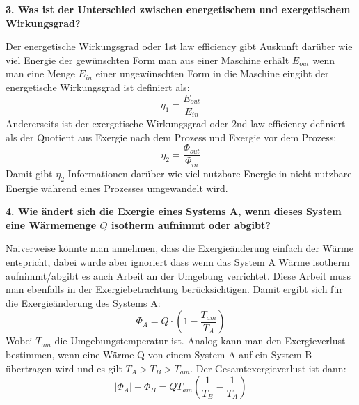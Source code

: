 \noindent\textbf{3. Was ist der Unterschied zwischen energetischem und exergetischem Wirkungsgrad?}\\
\begin{addmargin}[25pt]{0pt}
Der energetische Wirkungsgrad oder 1st law efficiency gibt Auskunft darüber wie viel Energie der gewünschten Form man aus einer Maschine erhält $E_{\si{out}}$ wenn man eine Menge $E_{\si{in}}$ einer ungewünschten Form in die Maschine eingibt der energetische Wirkungsgrad ist definiert als:
\begin{equation}\label{eq:energetischer_Wirkungsgrad}
    \eta_1 = \frac{E_{\si{out}}}{E_{\si{in}}}
\end{equation}
Andererseits ist der exergetische Wirkungsgrad oder 2nd law efficiency definiert als der Quotient aus Exergie nach dem Prozess und Exergie vor dem Prozess:
\begin{equation}\label{eq_exergetischer_Wirkungsgrad}
    \eta_2 = \frac{\Phi_{\si{out}}}{\Phi_{\si{in}}}
\end{equation}
Damit gibt $\eta_2$ Informationen darüber wie viel nutzbare Energie in nicht nutzbare Energie während eines Prozesses umgewandelt wird.\\
\end{addmargin}
\newpage
\noindent\textbf{4. Wie ändert sich die Exergie eines Systems A, wenn dieses System eine Wärmemenge $Q$ isotherm aufnimmt oder abgibt?}\\
\begin{addmargin}[25pt]{0pt}
Naiverweise könnte man annehmen, dass die Exergieänderung einfach der Wärme entspricht, dabei wurde aber ignoriert dass wenn das System A Wärme isotherm aufnimmt/abgibt es auch Arbeit an der Umgebung verrichtet. Diese Arbeit muss man ebenfalls in der Exergiebetrachtung berücksichtigen. Damit ergibt sich für die Exergieänderung des Systems A:
\begin{equation}\label{eq:Exergieänderung_A}
    \Phi_{\si{A}} = Q\cdot \left(1-\frac{T_{\si{am}}}{T_{\si{A}}}\right)
\end{equation}
Wobei $T_{\si{am}}$ die Umgebungstemperatur ist. Analog kann man den Exergieverlust bestimmen, wenn eine Wärme Q von einem System A auf ein System B übertragen wird und es gilt $T_{\si{A}} > T_{\si{B}} >T_{\si{am}}$. Der Gesamtexergieverlust ist dann:
\begin{equation}\label{eq:Exergieverlust}
    \left| \Phi_{\si{A}}\right| - \Phi_{\si{B}} = QT_{\si{am}}\left(\frac{1}{T_{\si{B}}}-\frac{1}{T_{\si{A}}}\right)
\end{equation}
\end{addmargin}

